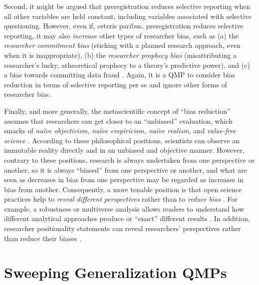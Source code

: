 \documentclass[authordate, meta, issue]{jote-new-article}
\begin{document}
Second, it might be argued that preregistration reduces selective reporting when all other variables are held constant, including variables associated with selective questioning. However, even if, ceteris paribus, preregistration reduces selective reporting, it may also \emph{increase} other types of researcher bias, such as (a) the \emph{researcher commitment bias} (sticking with a planned research approach, even when it is inappropriate), (b) the \emph{researcher prophecy bias} (misattributing a researcher’s lucky, atheoretical prophecy to a theory’s predictive power), and (c) a bias towards committing data fraud \parencites[for a discussion, please see][]{Rubin2022a}. Again, it is a QMP to consider bias reduction in terms of selective reporting per se and ignore other forms of researcher bias.



Finally, and more generally, the metascientific concept of “bias reduction” assumes that researchers can get closer to an “unbiased” evaluation, which smacks of \emph{naïve} \emph{objectivism,} \emph{naïve empiricism, naïve realism, }and\emph{ value-free science} \parencites{Field2021}[p. 228]{Morawski2019}{Reiss2020}{Strong1991}{Dijk2021}{Wiggins2019}. According to these philosophical positions, scientists can observe an immutable reality directly and in an unbiased and objective manner. However, contrary to these positions, research is always undertaken from one perspective or another, so it is always “biased” from one perspective or another, and what are seen as decreases in bias from one perspective may be regarded as increases in bias from another. Consequently, a more tenable position is that open science practices help to \emph{reveal different} \emph{perspectives} rather than to \emph{reduce} \emph{bias} \parencites{Field2021}{Grossmann2021}{Jamieson2023}{Pownall2022}. For example, a robustness or multiverse analysis allows readers to understand how different analytical approaches produce or “enact” different results \parencites{DelGiudice2021}{Morey2019}{Rubin2020}[for a discussion of the “enactment” perspective, see][]{Derksen2022a}. In addition, researcher positionality statements can reveal researchers’ perspectives rather than reduce their biases \parencites{Jamieson2023}.



\section{Sweeping Generalization QMPs}
\end{document}
